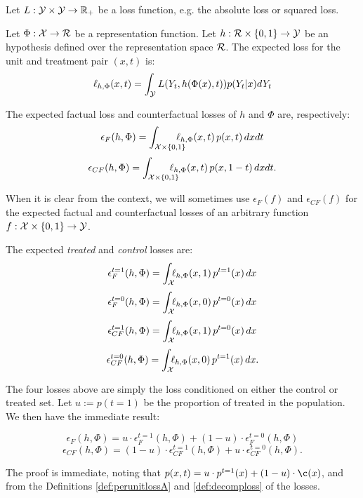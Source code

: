 


Let $L : \mathcal Y \times \mathcal Y \rightarrow \mathbb{R}_+$ be a loss function, e.g. the absolute loss or squared loss.
\begin{thmappdef}\label{def:perunitlossA}
Let $\Phi : \mathcal X \rightarrow \mathcal{R}$ be a representation function.
Let $h :\mathcal{R} \times \{0,1\} \rightarrow \mathcal Y$ be an hypothesis defined over the representation space $\mathcal{R}$.
The expected loss for the unit and treatment pair $(x,t)$ is:
$$\ell_{h,\Phi}(x,t) = \int_\mathcal Y L(Y_t,h(\Phi(x),t)) p(Y_t|x) dY_t$$
\end{thmappdef}

\begin{thmappdef}\label{def:epfepcf}
The expected factual loss and counterfactual losses of $h$ and $\Phi$ are, respectively:
$$\epsilon_F(h,\Phi) = \int_{\mathcal X \times \{0,1\}} \!\!\!\!\!\!\! \ell_{h,\Phi}(x,t)\, p(x,t)\, dxdt $$
$$\epsilon_{CF}(h,\Phi) = \int_{\mathcal X \times \{0,1\}} \!\!\!\!\!\!\! \ell_{h,\Phi}(x,t)\, p(x,1-t)\, dxdt .$$
\end{thmappdef}
When it is clear from the context, we will sometimes use $\epsilon_F(f)$ and $\epsilon_{CF}(f)$ for the expected factual and counterfactual losses of an arbitrary function $f: \mathcal X \times \{0,1\} \rightarrow \mathcal Y$.

\begin{thmappdef}\label{def:decomploss}
The expected \emph{treated} and \emph{control} losses are:
$$\epsilon^{t=1}_F(h,\Phi) = \int_{\mathcal X } \!\!\! \ell_{h,\Phi}(x,1)\, p^{t=1}(x)\, dx $$
$$\epsilon^{t=0}_F(h,\Phi) = \int_{\mathcal X } \!\!\! \ell_{h,\Phi}(x,0)\, p^{t=0}(x)\, dx $$
$$\epsilon^{t=1}_{CF}(h,\Phi) = \int_{\mathcal X} \!\!\! \ell_{h,\Phi}(x,1)\, p^{t=0}(x)\, dx $$
$$\epsilon^{t=0}_{CF}(h,\Phi) = \int_{\mathcal X } \!\!\! \ell_{h,\Phi}(x,0)\, p^{t=1}(x)\, dx .$$
\end{thmappdef}
The four losses above are simply the loss conditioned on either the control or treated set.  Let $u := p(t=1)$ be the proportion of treated in the population. We then have the immediate result:
\begin{thmapplem}\label{lem:epsdecopm}
$$\epsilon_F(h,\Phi) = u\cdot \epsilon^{t=1}_F(h,\Phi) + (1-u)\cdot \epsilon^{t=0}_F(h,\Phi)$$
$$\epsilon_{CF}(h,\Phi) = (1-u)\cdot \epsilon^{t=1}_{CF}(h,\Phi) + u\cdot  \epsilon^{t=0}_{CF}(h,\Phi).$$
\end{thmapplem}
The proof is immediate, noting that $p(x,t) = u\cdot \pt(x) + (1-u)\cdot \c(x)$, and from the Definitions \ref{def:perunitlossA} and \ref{def:decomploss} of the losses.

